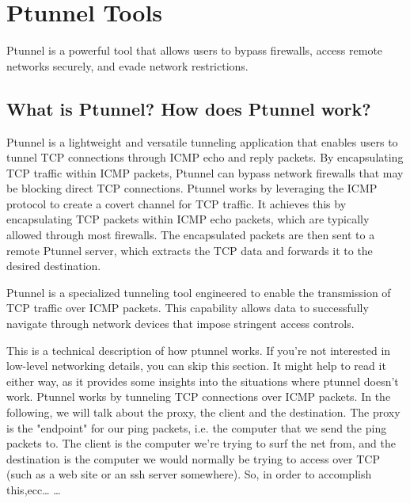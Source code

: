 
\section{Ptunnel Tools}
Ptunnel is a powerful tool that allows users to bypass firewalls, access remote networks securely, and evade network restrictions.
%
\subsection{What is Ptunnel? How does Ptunnel work?}
Ptunnel is a lightweight and versatile tunneling application that enables users to tunnel TCP connections through ICMP echo and reply packets. By encapsulating TCP traffic within ICMP packets, Ptunnel can bypass network firewalls that may be blocking direct TCP connections.
Ptunnel works by leveraging the ICMP protocol to create a covert channel for TCP traffic. It achieves this by encapsulating TCP packets within ICMP echo packets, which are typically allowed through most firewalls. The encapsulated packets are then sent to a remote Ptunnel server, which extracts the TCP data and forwards it to the desired destination.

Ptunnel is a specialized tunneling tool engineered to enable the transmission of TCP traffic over ICMP packets. This capability allows data to successfully navigate through network devices that impose stringent access controls.

This is a technical description of how ptunnel works. If you're not interested in low-level networking details, you can skip this section. It might help to read it either way, as it provides some insights into the situations where ptunnel doesn't work. Ptunnel works by tunneling TCP connections over ICMP packets. In the following, we will talk about the proxy, the client and the destination. The proxy is the "endpoint" for our ping packets, i.e. the computer that we send the ping packets to. The client is the computer we're trying to surf the net from, and the destination is the computer we would normally be trying to access over TCP (such as a web site or an ssh server somewhere).
So, in order to accomplish this,ecc\dots
\dots


